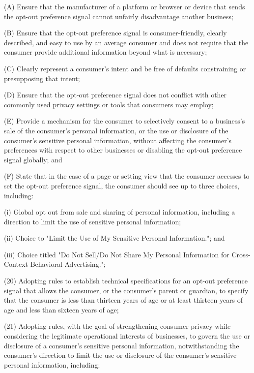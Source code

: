          (A)  Ensure that the manufacturer of a platform or browser or device that sends the opt-out preference signal cannot unfairly disadvantage another business;

          (B)  Ensure that the opt-out preference signal is consumer-friendly, clearly described, and easy to use by an average consumer and does not require that the consumer provide additional information beyond what is necessary;

          (C)  Clearly represent a consumer's intent and be free of defaults constraining or presupposing that intent;

          (D)  Ensure that the opt-out preference signal does not conflict with other commonly used privacy settings or tools that consumers may employ;

          (E)  Provide a mechanism for the consumer to selectively consent to a business's sale of the consumer's personal information, or the use or disclosure of the consumer's sensitive personal information, without affecting the consumer's preferences with respect to other businesses or disabling the opt-out preference signal globally; and

          (F)  State that in the case of a page or setting view that the consumer accesses to set the opt-out preference signal, the consumer should see up to three choices, including:

               (i)  Global opt out from sale and sharing of personal information, including a direction to limit the use of sensitive personal information;

              (ii)  Choice to "Limit the Use of My Sensitive Personal Information."; and

             (iii)  Choice titled "Do Not Sell/Do Not Share My Personal Information for Cross-Context Behavioral Advertising.";

    (20)  Adopting rules to establish technical specifications for an opt-out preference signal that allows the consumer, or the consumer's parent or guardian, to specify that the consumer is less than thirteen years of age or at least thirteen years of age and less than sixteen years of age;

    (21)  Adopting rules, with the goal of strengthening consumer privacy while considering the legitimate operational interests of businesses, to govern the use or disclosure of a consumer's sensitive personal information, notwithstanding the consumer's direction to limit the use or disclosure of the consumer's sensitive personal information, including:

